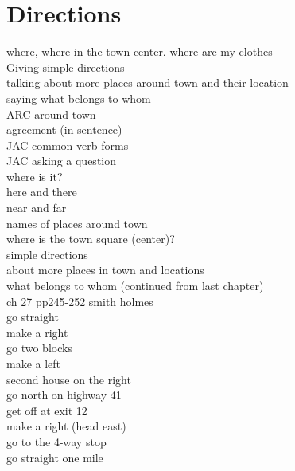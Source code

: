 \chapter{Directions}
where, where in the town center. where are my clothes\\
Giving simple directions\\
talking about more places around town and their location\\
saying what belongs to whom\\
ARC around town\\
agreement (in sentence)\\
JAC common verb forms\\
JAC asking a question\\
where is it?\\
here and there\\
near and far\\
names of places around town\\
where is the town square (center)?\\
simple directions\\
about more places in town and locations\\
what belongs to whom (continued from last chapter)\\
ch 27 pp245-252 smith holmes\\
go straight\\
make a right\\
go two blocks\\
make a left\\
second house on the right\\
go north on highway 41\\
get off at exit 12\\
make a right (head east)\\
go to the 4-way stop\\
go straight one mile\\
